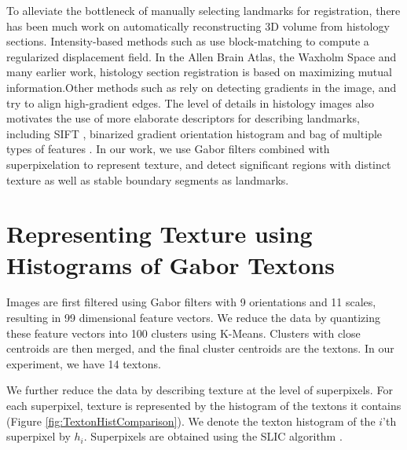 \documentclass{llncs}
\begin{document}
To alleviate the bottleneck of manually selecting landmarks for registration, there has been much work on automatically reconstructing 3D volume from histology sections. Intensity-based methods such as \cite{ourselin2001reconstructing, roberts2012toward} use block-matching to compute a regularized displacement field. In the Allen Brain Atlas\cite{lein2007genome, yushkevich20063d}, the Waxholm Space \cite{johnson2010waxholm} and many earlier work\cite{lee2005standard, ali2005automated}, histology section registration is based on maximizing mutual information.Other methods such as \cite{cifor2011smoothness, bagci2010automatic, haber2006intensity} rely on detecting gradients in the image, and try to align high-gradient edges. The level of details in histology images also motivates the use of more elaborate descriptors for describing landmarks, including SIFT \cite{sun2012nearly}, binarized gradient orientation histogram \cite{kurkure2011landmark} and bag of multiple types of features \cite{cruz2011visual}. In our work, we use Gabor filters combined with superpixelation to represent texture, and detect significant regions with distinct texture as well as stable boundary segments as landmarks.

\section{Representing Texture using Histograms of Gabor Textons} 

%
%
%

Images are first filtered using Gabor filters\cite{jain1990unsupervised, clausi2000designing} with 9 orientations and 11 scales, resulting in 99 dimensional feature vectors. We reduce the data by quantizing these feature vectors into 100 clusters using K-Means. Clusters with close centroids are then merged, and the final cluster centroids are the textons. In our experiment, we have 14 textons.


We further reduce the data by describing texture at the level of superpixels. For each superpixel, texture is represented by the histogram of the textons it contains (Figure \ref{fig:TextonHistComparison}). We denote the texton histogram of the $i$'th superpixel by $h_i$. Superpixels are obtained using the SLIC algorithm \cite{achanta2012slic}.
\end{document}
